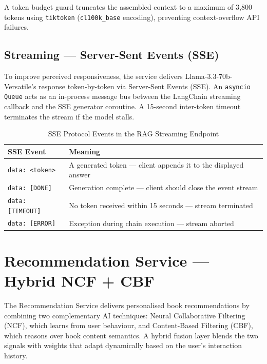 A token budget guard truncates the assembled context to a maximum of 3,800
tokens using \texttt{tiktoken} (\texttt{cl100k\_base} encoding), preventing
context-overflow API failures.

\subsection{Streaming --- Server-Sent Events (SSE)}

To improve perceived responsiveness, the service delivers
Llama-3.3-70b-Versatile's response token-by-token via Server-Sent Events
(SSE). An \texttt{asyncio Queue} acts as an in-process message bus between the
LangChain streaming callback and the SSE generator coroutine. A 15-second
inter-token timeout terminates the stream if the model stalls.

\begin{table}[H]
\centering
\caption{SSE Protocol Events in the RAG Streaming Endpoint}
\label{tab:sseevents}
\begin{tabularx}{\textwidth}{|l|X|}
\hline
\textbf{SSE Event} & \textbf{Meaning} \\
\hline
\texttt{data: <token>}   & A generated token --- client appends it to the displayed answer \\
\hline
\texttt{data: [DONE]}    & Generation complete --- client should close the event stream \\
\hline
\texttt{data: [TIMEOUT]} & No token received within 15 seconds --- stream terminated \\
\hline
\texttt{data: [ERROR]}   & Exception during chain execution --- stream aborted \\
\hline
\end{tabularx}
\end{table}

\section{Recommendation Service --- Hybrid NCF + CBF}
\label{sec:recommender}

The Recommendation Service delivers personalised book recommendations by
combining two complementary AI techniques: Neural Collaborative Filtering
(NCF), which learns from user behaviour, and Content-Based Filtering (CBF),
which reasons over book content semantics. A hybrid fusion layer blends the
two signals with weights that adapt dynamically based on the user's interaction
history.

